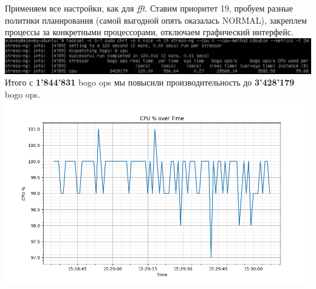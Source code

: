 \documentclass[12pt,onecolumn]{article}
\begin{document}
Применяем все настройки, как для \textit{fft}. Ставим приоритет 19, пробуем разные политики планирования (самой выгодной опять оказалась NORMAL), закреплем процессы за конкретными процессорами, отключаем графический интерфейс.\\
\includegraphics[width=\textwidth]{image/cpu-cdouble-max.png}
Итого с \textbf{1'844'831} bogo ops мы повысили производительность до \textbf{3'428'179} bogo ops.\\
\includegraphics[width=\textwidth]{image/cpu_usage_max.png}
\end{document}
